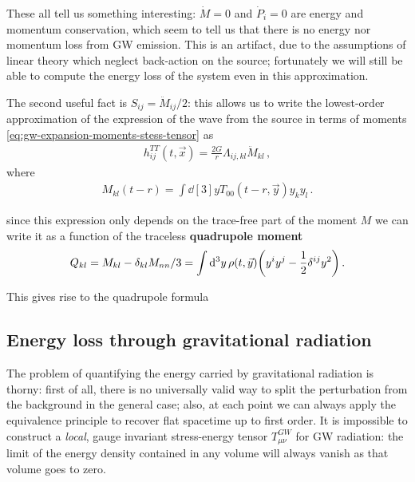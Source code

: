 \documentclass[main.tex]{subfiles}
\begin{document}
These all tell us something interesting: \(\dot{M} = 0\) and \(\dot{P}_{i} = 0\) are energy and momentum conservation, which seem to tell us that there is no energy nor momentum loss from \ac{GW} emission. 
This is an artifact, due to the assumptions of linear theory which neglect back-action on the source; fortunately we will still be able to compute the energy loss of the system even in this approximation.

The second useful fact is \(S_{ij} = \ddot{M}_{ij} / 2\): this allows us to write the lowest-order approximation of the expression of the wave from the source in terms of moments \eqref{eq:gw-expansion-moments-stess-tensor} as 
%
\begin{align}
h_{ij}^{TT}(t, \vec{x}) = \frac{2 G}{r} \Lambda_{ij, kl} \ddot{M}_{kl}
\,,
\end{align}
%
where 
%
\begin{align}
M_{kl}(t-r) = \int \dd[3]{y} T_{00}(t -r, \vec{y}) y_k y_l
\,.
\end{align}

since this expression only depends on the trace-free part of the moment \(M\) we can write it as a function of the traceless \textbf{quadrupole moment} 
%
\begin{align} \label{eq:quadrupole}
Q_{kl} = M_{kl} - \delta_{kl} M_{nn} / 3
= \int \dd[3]{y} \rho (t, \vec{y}) \qty(y^{i } y^{j} - \frac{1}{2} \delta^{ij} y^2)
\,.
\end{align}

This gives rise to the quadrupole formula 
%

\subsection{Energy loss through gravitational radiation}

The problem of quantifying the energy carried by gravitational radiation is thorny: first of all, there is no universally valid way to split the perturbation from the background in the general case; also, at each point we can always apply the equivalence principle to recover flat spacetime up to first order. 
It is impossible to construct a \emph{local}, gauge invariant stress-energy tensor \(T_{\mu \nu }^{GW}\) for \ac{GW} radiation: the limit of the energy density contained in any volume will always vanish as that volume goes to zero. 
\end{document}
